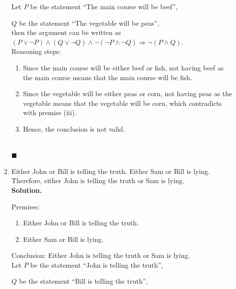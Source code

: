 \documentclass{report}
\newcommand{\sol}{\vspace{1em}\\\textbf{Solution.}\vspace{0.5em}}
\newcommand{\qed}{‎\\‎\hfill$\blacksquare$\vspace{1em}}
\begin{document}
\begin{enumerate}[leftmargin=*]
\begin{enumerate}
                    Let $P$ be the statement ``The main course will be beef'',

                    $Q$ be the statement ``The vegetable will be peas'',\\

                    then the argument can be written as $(P \vee \neg P) \wedge (Q \vee \neg Q)
                        \wedge \neg(\neg P \wedge \neg Q) \Rightarrow \neg(P \wedge Q)$.\\

                    Reasoning steps:
                    \begin{enumerate}
                        \item Since the main course will be either beef or fish, not having beef as the main
                              course means that the main course will be fish.

                        \item Since the vegetable will be either peas or corn, not having peas as the
                              vegetable means that the vegetable will be corn, which contradicts with premise
                              (iii).

                        \item Hence, the conclusion is not valid.
                    \end{enumerate} \qed

              \item Either John or Bill is telling the truth. Either Sam or Bill is lying.
                    Therefore, either John is telling the truth or Sam is lying. \sol{}

                    Premises:
                    \begin{enumerate}
                        \item Either John or Bill is telling the truth.
                        \item Either Sam or Bill is lying.
                    \end{enumerate}
                    \vspace{1em}
                    Conclusion: Either John is telling the truth or Sam is lying.\\

                    Let $P$ be the statement ``John is telling the truth'',

                    $Q$ be the statement ``Bill is telling the truth'',


\end{enumerate}
\end{enumerate}
\end{document}
